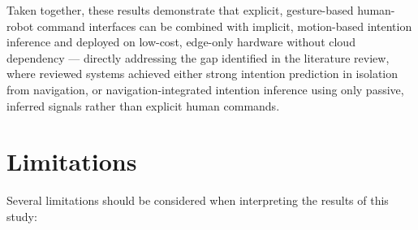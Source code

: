 Taken together, these results demonstrate that explicit, gesture-based human-robot
command interfaces can be combined with implicit, motion-based intention inference and
deployed on low-cost, edge-only hardware without cloud dependency — directly
addressing the gap identified in the literature review, where reviewed systems
achieved either strong intention prediction in isolation from navigation, or
navigation-integrated intention inference using only passive, inferred signals rather
than explicit human commands.

\section{Limitations}

Several limitations should be considered when interpreting the results of this study:

